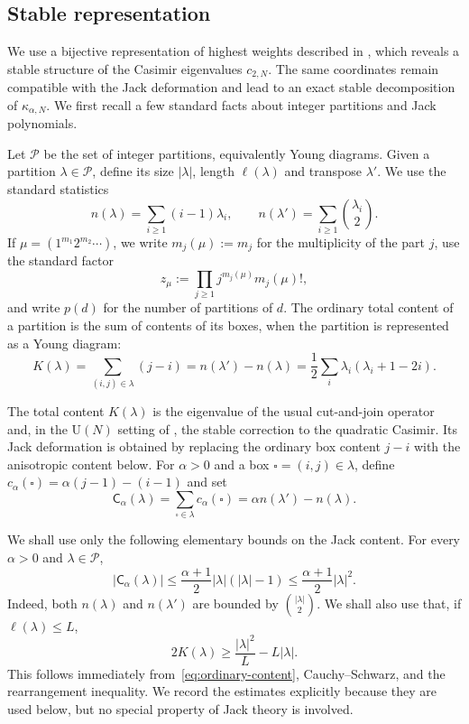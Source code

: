 \documentclass[11pt,a4paper,reqno]{article}
\theoremstyle{definition}
\theoremstyle{remark}
\newcommand\U{{\mathrm U}}
\newcommand\cA{{\mathsf C}}
\newcommand\Pcal{{\mathcal P}}
\newcommand\ellpart{{\ell}}
\begin{document}
\subsection{Stable representation}\label{subsec:stable-representation}

We use a bijective representation of highest weights described in \cite{Lem22}, which reveals a stable structure of the Casimir eigenvalues $c_{2,N}$.  The same coordinates remain compatible with the Jack deformation and lead to an exact stable decomposition of $\kappa_{\alpha,N}$.  We first recall a few standard facts about integer partitions and Jack polynomials.

Let $\Pcal$ be the set of integer partitions, equivalently Young diagrams.  Given a partition $\lambda\in\Pcal$, define its size $|\lambda|$, length $\ellpart(\lambda)$ and transpose $\lambda'$.  We use the standard statistics
\[
n(\lambda)=\sum_{i\geq1}(i-1)\lambda_i,\qquad n(\lambda')=\sum_{i\geq1}\binom{\lambda_i}{2}.
\]
If $\mu=(1^{m_1}2^{m_2}\cdots)$, we write $m_j(\mu):=m_j$ for the multiplicity of the part $j$, use the standard factor
\begin{equation}\label{eq:z-mu}
z_\mu:=\prod_{j\geq1}j^{m_j(\mu)}m_j(\mu)!,
\end{equation}
and write $p(d)$ for the number of partitions of $d$.
The ordinary total content of a partition is the sum of contents of its boxes, when the partition is represented as a Young diagram:
\begin{equation}\label{eq:ordinary-content}
K(\lambda)=\sum_{(i,j)\in\lambda}(j-i)=n(\lambda')-n(\lambda)=\frac12\sum_i\lambda_i(\lambda_i+1-2i).
\end{equation}

The total content $K(\lambda)$ is the eigenvalue of the usual cut-and-join operator and, in the $\U(N)$ setting of \cite{LemMai25,LM2}, the stable correction to the quadratic Casimir.  Its Jack deformation is obtained by replacing the ordinary box content $j-i$ with the anisotropic content below.  For $\alpha>0$ and a box $\square=(i,j)\in\lambda$, define $c_\alpha(\square)=\alpha(j-1)-(i-1)$ and set
\begin{equation}\label{eq:Calpha}
\cA_\alpha(\lambda)=\sum_{\square\in\lambda}c_\alpha(\square)=\alpha n(\lambda')-n(\lambda).
\end{equation}

We shall use only the following elementary bounds on the Jack content.  For every $\alpha>0$ and $\lambda\in\Pcal$,
\begin{equation}\label{eq:content-crude}
|\cA_\alpha(\lambda)|\leq \frac{\alpha+1}{2}|\lambda|(|\lambda|-1)\leq \frac{\alpha+1}{2}|\lambda|^2.
\end{equation}
Indeed, both $n(\lambda)$ and $n(\lambda')$ are bounded by $\binom{|\lambda|}{2}$.  We shall also use that, if $\ellpart(\lambda)\leq L$,
\begin{equation}\label{eq:K-sharp-lower}
2K(\lambda)\geq \frac{|\lambda|^2}{L}-L|\lambda|.
\end{equation}
This follows immediately from~\eqref{eq:ordinary-content}, Cauchy--Schwarz, and the rearrangement inequality.  We record the estimates explicitly because they are used below, but no special property of Jack theory is involved.
\end{document}
